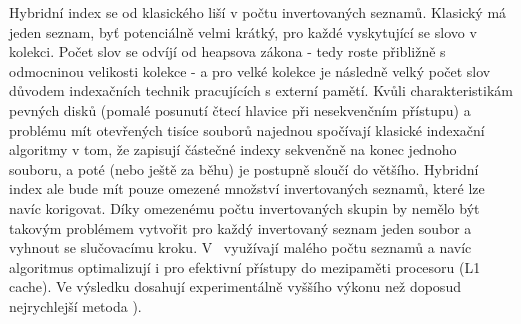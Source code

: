 \documentclass[11pt,letterpaper,oneside,openright]{book}
\begin{document}
Hybridní index se od klasického liší v počtu invertovaných seznamů. Klasický má
jeden seznam, byť potenciálně velmi krátký, pro každé vyskytující se slovo v
kolekci. Počet slov se odvíjí od heapsova zákona - tedy roste přibližně s
odmocninou velikosti kolekce - a pro velké kolekce je následně velký počet slov
důvodem indexačních technik pracujících s externí pamětí. Kvůli
charakteristikám pevných disků (pomalé posunutí čtecí hlavice při nesekvenčním
přístupu) a problému mít otevřených tisíce souborů najednou spočívají klasické
indexační algoritmy v tom, že zapisují částečné indexy sekvenčně na konec
jednoho souboru, a poté (nebo ještě za běhu) je postupně sloučí do většího.
Hybridní index ale bude mít pouze omezené množství invertovaných seznamů, které
lze navíc korigovat. Díky omezenému počtu invertovaných skupin by nemělo být
takovým problémem vytvořit pro každý invertovaný seznam jeden soubor a vyhnout
se slučovacímu kroku. V~\cite{Bast:2011:FCH:1993036.1993040} využívají malého
počtu seznamů a navíc algoritmus optimalizují i pro efektivní přístupy do
mezipaměti procesoru (L1 cache). Ve výsledku dosahují experimentálně vyššího
výkonu než doposud nejrychlejší metoda ).


%
%
\end{document}
